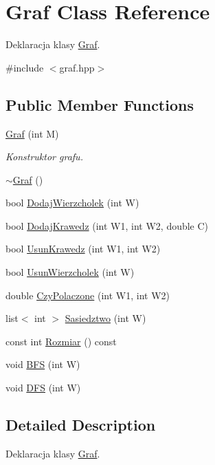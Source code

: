 \hypertarget{class_graf}{\section{Graf Class Reference}
\label{class_graf}
}


Deklaracja klasy \hyperlink{class_graf}{Graf}.  




{\ttfamily \#include $<$graf.\-hpp$>$}

\subsection*{Public Member Functions}
\begin{DoxyCompactItemize}
\item 
\hyperlink{class_graf_a99997a888ada93f1c566555bea5d49fe}{Graf} (int M)
\begin{DoxyCompactList}\small\item\em Konstruktor grafu. \end{DoxyCompactList}\item 
\hyperlink{class_graf_a4ff3904fd04f367ac0219b52719c567e}{$\sim$\-Graf} ()
\item 
bool \hyperlink{class_graf_a0002b93180c77232872de7f0d8a14282}{Dodaj\-Wierzcholek} (int W)
\item 
bool \hyperlink{class_graf_abb79067f8131701f5d42d88206486a5b}{Dodaj\-Krawedz} (int W1, int W2, double C)
\item 
bool \hyperlink{class_graf_afe6b63700e9e90b4432749a6a4ac14f5}{Usun\-Krawedz} (int W1, int W2)
\item 
bool \hyperlink{class_graf_ad46ff4c28754fbaf97702ef5dc1f71fb}{Usun\-Wierzcholek} (int W)
\item 
double \hyperlink{class_graf_a4546d2b7612f96df3a0ace5bc2c93553}{Czy\-Polaczone} (int W1, int W2)
\item 
list$<$ int $>$ \hyperlink{class_graf_ade291b5dec10139fdc61a043ebd340ca}{Sasiedztwo} (int W)
\item 
const int \hyperlink{class_graf_ad6271a1b664eec00682018761ca0437c}{Rozmiar} () const 
\item 
void \hyperlink{class_graf_aac1325dd0ba799888beee5f93b621192}{B\-F\-S} (int W)
\item 
void \hyperlink{class_graf_a53dbabccd3745e38b45c46e29e301f8e}{D\-F\-S} (int W)
\end{DoxyCompactItemize}


\subsection{Detailed Description}
Deklaracja klasy \hyperlink{class_graf}{Graf}. 

